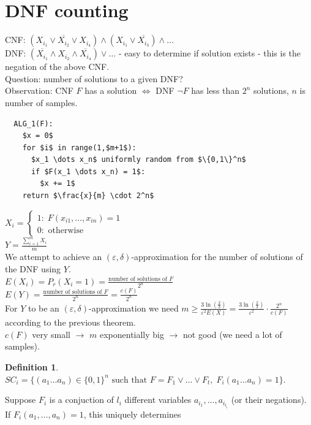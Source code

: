 \documentclass[a4paper, 12pt]{book}
\theoremstyle{definition}
\newtheorem{defn}[counter]{Definition}
\theoremstyle{remark}
\begin{document}
\section{DNF counting}

CNF: $(X_{i_1} \lor \overline{X_{i_2}} \lor X_{i_4}) \land (X_{i_1} \lor \overline{X_{i_3}}) \land \dots$ \\
DNF: $(\overline{X_{i_1}} \land X_{i_2} \land \overline{X_{i_4}}) \lor \dots$
- easy to determine if solution exists - this is the negation of the above CNF. \\
Question: number of solutions to a given DNF? \\
Observation: CNF $F$ has a solution $\iff$ DNF $\neg F$ has less than $2^n$ solutions, $n$ is number of samples.
\begin{lstlisting}
  ALG_1(F):
    $x = 0$
    for $i$ in range(1,$m+1$):
      $x_1 \dots x_n$ uniformly random from $\{0,1\}^n$
      if $F(x_1 \dots x_n) = 1$:
        $x += 1$
    return $\frac{x}{m} \cdot 2^n$
\end{lstlisting}
$X_i = \begin{cases}
  1: \; F(x_{i1}, \ldots, x_{in}) = 1 \\
  0: \text{ otherwise}
\end{cases}$ \\
$Y = \frac{\sum_{i=1}^{m} X_i}{m}$ \\
We attempt to achieve an $(\varepsilon,\delta)$-approximation for the number of solutions of the DNF using $Y$. \\
$E(X_i) = P_r(X_i = 1) = \frac{\text{number of solutions of }F}{2^n}$ \\
$E(Y) = \frac{\text{number of solutions of }F}{2^n} = \frac{c(F)}{2^n}$ \\
For $Y$ to be an $(\varepsilon,\delta)$-approximation we need $m \geq \frac{3 \ln\left(\frac{2}{\delta}\right)}{\varepsilon^2 E(X)} =
\frac{3 \ln\left(\frac{2}{\delta}\right)}{\varepsilon^2} \cdot \frac{2^n}{c(F)}$ according to the previous theorem. \\
$c(F)$ very small $\to$ $m$ exponentially big $\to$ not good (we need a lot of samples).
\begin{defn} \text{} \\
  $SC_i = \{(a_1 \dots a_n) \in \{0,1\}^n \text{ such that } F = F_1 \lor \dots \lor F_t, \; F_i(a_1 \dots a_n) = 1\}$.
\end{defn}
Suppose $F_i$ is a conjuction of $l_i$ different variables $a_{i_1}, \ldots, a_{i_{l_i}}$ (or their negations). If $F_i(a_1, \ldots, a_n) = 1$, this uniquely determines
\end{document}
